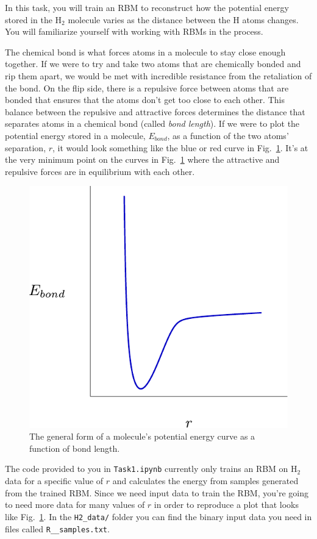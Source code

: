 \documentclass[12pt]{article}
\begin{document}
In this task, you will train an RBM to reconstruct how the potential energy stored in the H$_2$ molecule varies as the distance between the H atoms changes. You will familiarize yourself with working with RBMs in the process. 

The chemical bond is what forces atoms in a molecule to stay close enough together. If we were to try and take two atoms that are chemically bonded and rip them apart, we would be met with incredible resistance from the retaliation of the bond. On the flip side, there is a repulsive force between atoms that are bonded that ensures that the atoms don't get too close to each other. This balance between the repulsive and attractive forces determines the distance that separates atoms in a chemical bond (called \textit{bond length}). If we were to plot the potential energy stored in a molecule, $E_{bond}$, as a function of the two atoms' separation, $r$, it would look something like the blue or red curve in Fig.~\ref{fig:potential_curve}. It's at the very minimum point on the curves in Fig.~\ref{fig:potential_curve} where the attractive and repulsive forces are in equilibrium with each other.

\begin{figure}
    \begin{center}
        \includegraphics[width=0.4\linewidth]{../figures/potential_energy_curve_vanilla.pdf}
    \end{center}
    \caption{The general form of a molecule's potential energy curve as a function of bond length.}
    \label{fig:potential_curve}
\end{figure}

The code provided to you in \texttt{Task1.ipynb} currently only trains an RBM on H$_2$ data for a specific value of $r$ and calculates the energy from samples generated from the trained RBM. Since we need input data to train the RBM, you're going to need more data for many values of $r$ in order to reproduce a plot that looks like Fig.~\ref{fig:potential_curve}. In the \texttt{H2\_data/} folder you can find the binary input data you need in files called \texttt{R\_<r value>\_samples.txt}. 
\end{document}

